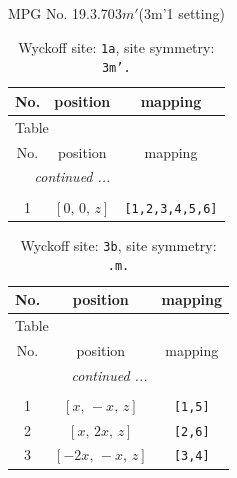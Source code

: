 \documentclass[fleqn,8pt]{jsarticle}
\begin{document}
\setcounter{MaxMatrixCols}{32}

\renewcommand{\tablename}{Table~}
\renewcommand{\figurename}{Figure~}
\begin{center}
\LARGE
MPG No. 19.3.70\quad$3m'$\quad(3m'1 setting)
\end{center}
\renewcommand{\arraystretch}{1.2}
\begin{longtable}{ccc}
\caption{Wyckoff site: {\tt 1a}, site symmetry: {\tt 3m'.}}
 \\
 \hline \hline
No. & position & mapping \\ \hline \endfirsthead

\multicolumn{2}{l}{\tablename\ \thetable{}} \\
 \hline \hline
No. & position & mapping \\ \hline \endhead

 \hline \hline
\multicolumn{2}{r}{\footnotesize\it continued ...} \\ \endfoot

 \hline \hline
\multicolumn{2}{r}{} \\ \endlastfoot

1 & $\left[ 0,\, 0,\, z \right]$ & {\tt [1,2,3,4,5,6]} \\
\end{longtable}
\renewcommand{\arraystretch}{1.2}
\begin{longtable}{ccc}
\caption{Wyckoff site: {\tt 3b}, site symmetry: {\tt .m.}}
 \\
 \hline \hline
No. & position & mapping \\ \hline \endfirsthead

\multicolumn{2}{l}{\tablename\ \thetable{}} \\
 \hline \hline
No. & position & mapping \\ \hline \endhead

 \hline \hline
\multicolumn{2}{r}{\footnotesize\it continued ...} \\ \endfoot

 \hline \hline
\multicolumn{2}{r}{} \\ \endlastfoot

1 & $\left[ x,\, - x,\, z \right]$ & {\tt [1,5]} \\ \hline
2 & $\left[ x,\, 2 x,\, z \right]$ & {\tt [2,6]} \\ \hline
3 & $\left[ - 2 x,\, - x,\, z \right]$ & {\tt [3,4]} \\
\end{longtable}
\renewcommand{\arraystretch}{1.2}
\end{document}
